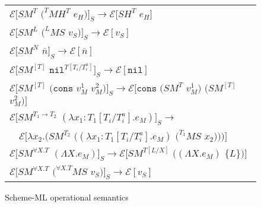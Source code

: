 \begin{figure}[p]
\centering
\begin{tabular}{l}
$\mathscr{E}[SM^{T}$ $(^{T}MH^{T}$ $e_{H})]_{S}\rightarrow\mathscr{E}[SH^{T}$ $e_{H}]$ \\
$\mathscr{E}[SM^{L}$ $(^{L}MS$ $v_{S})]_{S}\rightarrow\mathscr{E}[v_{S}]$ \\
$\mathscr{E}[SM^{N}$ $\overline{n}]_{S}\rightarrow\mathscr{E}[\overline{n}]$ \\
$\mathscr{E}[SM^{[T]}$ $\mathtt{nil}^{T[T_{i}/T_{i}^{a}]}]_{S}\rightarrow\mathscr{E}[\mathtt{nil}]$ \\
$\mathscr{E}[SM^{[T]}$ $(\mathtt{cons}$ $v_{M}^{1}$ $v_{M}^{2})]_{S}\rightarrow\mathscr{E}[\mathtt{cons}$ $(SM^{T}$ $v_{M}^{1})$ $(SM^{[T]}$ $v_{M}^{2})]$ \\
$\mathscr{E}[SM^{T_{1}\rightarrow T_{2}}$ $(\lambda x_{1}:T_{1}[T_{i}/T_{i}^{a}].e_{M})]_{S}\rightarrow$ \\
$\quad\mathscr{E}[\lambda x_{2}.(SM^{T_{2}}$ $((\lambda x_{1}:T_{1}[T_{i}/T_{i}^{a}].e_{M})$ $(^{T_{1}}MS$ $x_{2})))]$ \\
$\mathscr{E}[SM^{\forall X.T}$ $(\Lambda X.e_{M})]_{S}\rightarrow\mathscr{E}[SM^{T[L/X]}$ $((\Lambda X.e_{M})$ $\lbrace L\rbrace)]$ \\
$\mathscr{E}[SM^{\forall X.T}$ $(^{\forall X.T}MS$ $v_{S})]_{S}\rightarrow\mathscr{E}[v_{S}]$
\end{tabular}
\caption{Scheme-ML operational semantics}
\label{isos}
\end{figure}